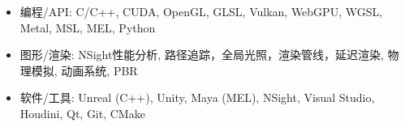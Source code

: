


\begin{itemize}[parsep=0.5ex]
  \item 编程/API: C/C++, CUDA, OpenGL, GLSL, Vulkan, WebGPU, WGSL, Metal, MSL, MEL, Python
  \item 图形/渲染: NSight性能分析, 路径追踪，全局光照，渲染管线，延迟渲染, 物理模拟, 动画系统, PBR
  \item 软件/工具: Unreal (C++), Unity, Maya (MEL), NSight, Visual Studio, Houdini, Qt, Git, CMake
\end{itemize}

